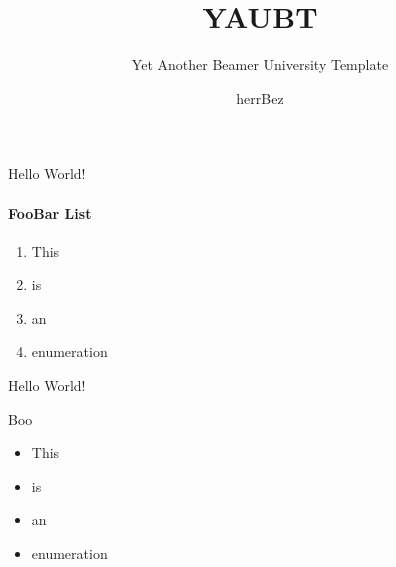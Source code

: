 \documentclass{beamer}
\title{YAUBT}
\subtitle{Yet Another Beamer University Template}
\author{herrBez}
\begin{document}
\begin{frame}
  \titlepage
\end{frame}


\begin{frame}{Hello World!}
\framesubtitle{FooBar List}

    \begin{enumerate}
    \item This
    \item is
    \item an
    \item enumeration
    \end{enumerate}
\end{frame}


\begin{frame}{Hello World!}
    \begin{block}{Boo}
          \begin{itemize}
            \item This
            \item is
            \item an
            \item enumeration
        \end{itemize}
    \end{block}
\end{frame}
\end{document}
